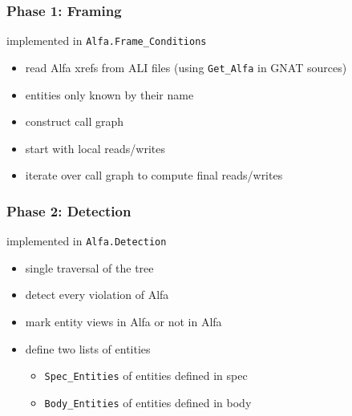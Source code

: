 \documentclass{beamer}
\newcommand{\vs}{\vspace{0.5cm}}
\newenvironment{specialframe}{%
  \begin{frame}[fragile,environment=specialframe]}{\end{frame}}
\begin{document}
\begin{specialframe}\frametitle{Phase 1: Framing}

  implemented in \verb|Alfa.Frame_Conditions|

  \vs

  \begin{itemize}
  \item read Alfa xrefs from ALI files (using \verb|Get_Alfa| in GNAT sources)
  \item entities only known by their name
  \item construct call graph
  \item start with local reads/writes
  \item iterate over call graph to compute final reads/writes
  \end{itemize}
\end{specialframe}

\begin{specialframe}\frametitle{Phase 2: Detection}

  implemented in \verb|Alfa.Detection|

  \vs

  \begin{itemize}
  \item single traversal of the tree
  \item detect every violation of Alfa
  \item mark entity views in Alfa or not in Alfa
  \item define two lists of entities
    \begin{itemize}
    \item \verb|Spec_Entities| of entities defined in spec
    \item \verb|Body_Entities| of entities defined in body
    \end{itemize}
  \end{itemize}
\end{specialframe}
\end{document}
